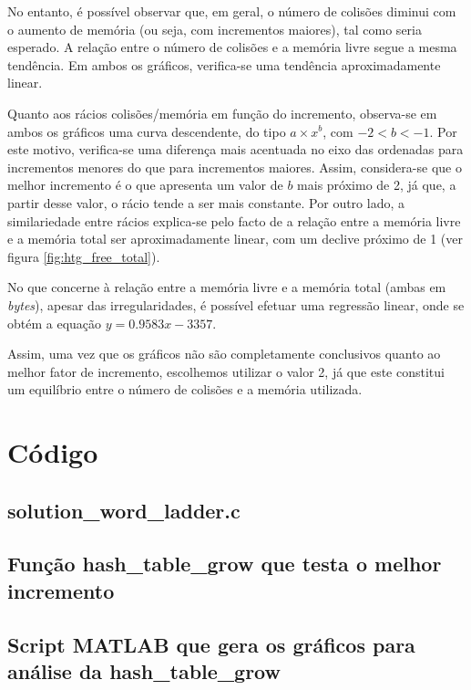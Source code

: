 \documentclass[portuguese,11pt,a4paper,titlepage]{article}
\newcommand{\srcdir}{..}
\newcommand{\hashtablegrowdir}{\srcdir/hash\_table\_grow-test}
\begin{document}
No entanto, é possível observar que, em geral, o número de colisões diminui com o aumento de memória (ou seja, com incrementos maiores), tal como seria esperado. A relação entre o número de colisões e a memória livre segue a mesma tendência. Em ambos os gráficos, verifica-se uma tendência aproximadamente linear.

Quanto aos rácios colisões/memória em função do incremento, observa-se em ambos os gráficos uma curva descendente, do tipo \begin{math}a \times x^b\end{math}, com \begin{math}-2 < b < -1\end{math}. Por este motivo, verifica-se uma diferença mais acentuada no eixo das ordenadas para incrementos menores do que para incrementos maiores. Assim, considera-se que o melhor incremento é o que apresenta um valor de \begin{math}b\end{math} mais próximo de 2, já que, a partir desse valor, o rácio tende a ser mais constante. Por outro lado, a similariedade entre rácios explica-se pelo facto de a relação entre a memória livre e a memória total ser aproximadamente linear, com um declive próximo de 1 (ver figura \ref{fig:htg_free_total}).

No que concerne à relação entre a memória livre e a memória total (ambas em \textit{bytes}), apesar das irregularidades, é possível efetuar uma regressão linear, onde se obtém a equação \begin{math}y=0.9583x-3357\end{math}.

Assim, uma vez que os gráficos não são completamente conclusivos quanto ao melhor fator de incremento, escolhemos utilizar o valor 2, já que este constitui um equilíbrio entre o número de colisões e a memória utilizada.

\pagebreak
\section{Código}
\subsection{solution\_word\_ladder.c}

\pagebreak
\subsection{Função hash\_table\_grow que testa o melhor incremento}

\pagebreak
\subsection{Script MATLAB que gera os gráficos para análise da hash\_table\_grow} \label{MATLABcode}

\end{document}
